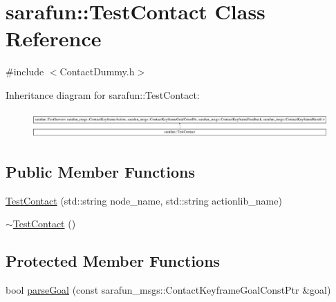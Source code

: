\hypertarget{classsarafun_1_1TestContact}{\section{sarafun\-:\-:Test\-Contact Class Reference}
\label{classsarafun_1_1TestContact}
}


{\ttfamily \#include $<$Contact\-Dummy.\-h$>$}

Inheritance diagram for sarafun\-:\-:Test\-Contact\-:\begin{figure}[H]
\begin{center}
\leavevmode
\includegraphics[height=1.012658cm]{classsarafun_1_1TestContact}
\end{center}
\end{figure}
\subsection*{Public Member Functions}
\begin{DoxyCompactItemize}
\item 
\hyperlink{classsarafun_1_1TestContact_a0b2c1e94e50342e0433ea04919c31189}{Test\-Contact} (std\-::string node\-\_\-name, std\-::string actionlib\-\_\-name)
\item 
\hyperlink{classsarafun_1_1TestContact_a8b045e1f7984add10b7c024b6fde69ed}{$\sim$\-Test\-Contact} ()
\end{DoxyCompactItemize}
\subsection*{Protected Member Functions}
\begin{DoxyCompactItemize}
\item 
bool \hyperlink{classsarafun_1_1TestContact_aa20264e537658c9eb9aad4a56d7d1d07}{parse\-Goal} (const sarafun\-\_\-msgs\-::\-Contact\-Keyframe\-Goal\-Const\-Ptr \&goal)
\end{DoxyCompactItemize}


